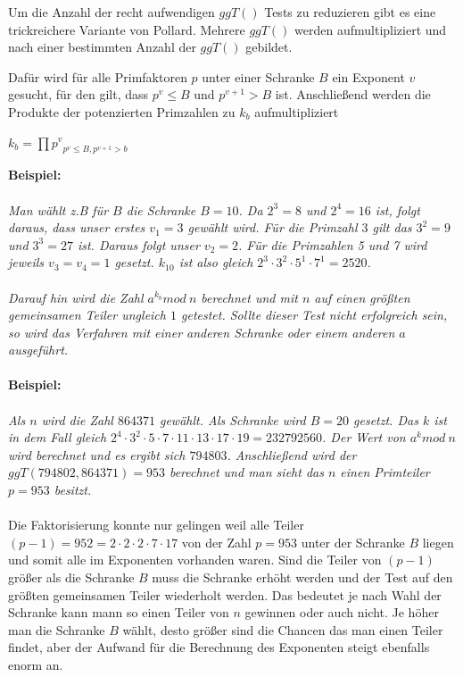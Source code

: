 \documentclass[10pt, bigheadings]{scrartcl}
\begin{document}
Um die Anzahl der recht aufwendigen $ggT()$ Tests zu reduzieren gibt es eine trickreichere Variante von
Pollard. Mehrere $ggT()$ werden aufmultipliziert und nach einer bestimmten Anzahl der $ggT()$ gebildet.

Dafür wird für alle Primfaktoren $p$ unter einer Schranke $B$ ein Exponent $v$ gesucht, für den
gilt, dass $p^v \leq B$ und $p^{v+1} > B $ ist. Anschließend werden die Produkte der potenzierten
Primzahlen zu $k_b$ aufmultipliziert
\begin{center}
$k_b = \prod{p^v}_{p^v\leq B, p^{v+1}>b}$
\end{center}
\textbf{Beispiel:}\\\\
{\it
Man wählt z.B für $B$ die Schranke $B=10$. Da $2^3 = 8$ und $2^4 = 16$ ist, folgt daraus, dass unser
erstes $v_1 = 3$ gewählt wird. Für die Primzahl $3$ gilt das $3^2 = 9$ und $3^3 = 27$ ist. Daraus
folgt unser $v_2 = 2$. Für die Primzahlen 5 und 7 wird jeweils $v_3 = v_4 = 1$ gesetzt. $k_{10}$ ist
also gleich $2^3\cdot3^2\cdot5^1\cdot7^1=2520$.\\\\
Darauf hin wird die Zahl $a^{k_b} mod\ n$ berechnet und mit $n$ auf einen größten gemeinsamen Teiler
ungleich $1$ getestet. Sollte dieser Test nicht erfolgreich sein, so wird das Verfahren mit einer
anderen Schranke oder einem anderen $a$ ausgeführt.\\\\
}
\textbf{Beispiel:}\\\\
{\it
Als $n$ wird die Zahl $864371$ gewählt. Als Schranke wird $B=20$ gesetzt. Das $k$ ist in dem Fall
gleich $2^4\cdot3^2\cdot5\cdot7\cdot11\cdot13\cdot17\cdot19 = 232792560$. Der Wert von $a^k mod\ n$
wird berechnet und es ergibt sich $794803$. Anschließend wird der $ggT(794802, 864371) = 953$ berechnet
und man sieht das $n$ einen Primteiler $p = 953$ besitzt.\\\\
}
Die Faktorisierung konnte nur gelingen weil alle Teiler $(p-1) = 952 = 2\cdot2\cdot2\cdot7\cdot17$
von der Zahl $p = 953$ unter der Schranke $B$ liegen und somit alle im Exponenten vorhanden waren. Sind die Teiler von $(p-1)$ größer als die Schranke $B$ muss die Schranke erhöht werden und der Test auf den größten
gemeinsamen Teiler wiederholt werden. Das bedeutet je nach Wahl der Schranke kann mann so einen
Teiler von $n$ gewinnen oder auch nicht. Je höher man die Schranke $B$ wählt, desto größer
sind die Chancen das man einen Teiler findet, aber der Aufwand für die Berechnung des Exponenten
steigt ebenfalls enorm an.
\end{document}
